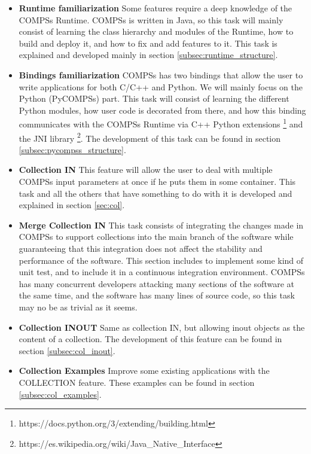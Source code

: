 \begin{itemize}
\item \textbf{Runtime familiarization} Some features require a deep knowledge of the COMPSs Runtime. COMPSs is written in Java, so this task will mainly consist of learning the class hierarchy and modules of the Runtime, how to build and deploy it, and how to fix and add features to it. This task is explained and developed mainly in section \ref{subsec:runtime_structure}.

\item \textbf{Bindings familiarization} COMPSs has two bindings that allow the user to write applications for both C/C++ and Python. We will mainly focus on the Python (PyCOMPSs) part. This task will consist of learning the different Python modules, how user code is decorated from there, and how this binding communicates with the COMPSs Runtime via C++ Python extensions \footnote{https://docs.python.org/3/extending/building.html} and the JNI library \footnote{https://es.wikipedia.org/wiki/Java\_Native\_Interface}. The development of this task can be found in section \ref{subsec:pycompss_structure}.

\item \textbf{Collection IN} This feature will allow the user to deal with multiple COMPSs input parameters at once if he puts them in some container. This task and all the others that have something to do with it is developed and explained in section \ref{sec:col}.

\item \textbf{Merge Collection IN} This task consists of integrating the changes made in COMPSs to support collections into the main branch of the software while guaranteeing that this integration does not affect the stability and performance of the software. This section includes to implement some kind of unit test, and to include it in a continuous integration environment. COMPSs has many concurrent developers attacking many sections of the software at the same time, and the software has many lines of source code, so this task may no be as trivial as it seems.

\item \textbf{Collection INOUT} Same as collection IN, but allowing inout objects as the content of a collection. The development of this feature can be found in section \ref{subsec:col_inout}.

\item \textbf{Collection Examples} Improve some existing applications with the COLLECTION feature. These examples can be found in section \ref{subsec:col_examples}.


\end{itemize}

